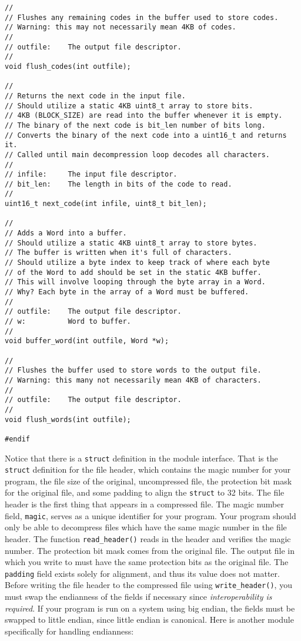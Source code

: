 \documentclass{article}
\begin{document}
\begin{lstlisting}[title=io.h]
//
// Flushes any remaining codes in the buffer used to store codes.
// Warning: this may not necessarily mean 4KB of codes.
//
// outfile:    The output file descriptor.
//
void flush_codes(int outfile);

//
// Returns the next code in the input file.
// Should utilize a static 4KB uint8_t array to store bits.
// 4KB (BLOCK_SIZE) are read into the buffer whenever it is empty.
// The binary of the next code is bit_len number of bits long.
// Converts the binary of the next code into a uint16_t and returns it.
// Called until main decompression loop decodes all characters.
//
// infile:     The input file descriptor.
// bit_len:    The length in bits of the code to read.
//
uint16_t next_code(int infile, uint8_t bit_len);

//
// Adds a Word into a buffer.
// Should utilize a static 4KB uint8_t array to store bytes.
// The buffer is written when it's full of characters.
// Should utilize a byte index to keep track of where each byte
// of the Word to add should be set in the static 4KB buffer.
// This will involve looping through the byte array in a Word.
// Why? Each byte in the array of a Word must be buffered.
//
// outfile:    The output file descriptor.
// w:          Word to buffer.
//
void buffer_word(int outfile, Word *w);

//
// Flushes the buffer used to store words to the output file.
// Warning: this many not necessarily mean 4KB of characters.
//
// outfile:    The output file descriptor.
//
void flush_words(int outfile);

#endif
\end{lstlisting}

Notice that there is a \texttt{struct} definition in the module interface. That
is the \texttt{struct} definition for the file header, which contains the magic
number for your program, the file size of the original, uncompressed file, the
protection bit mask for the original file, and some padding to align the
\texttt{struct} to 32 bits. The file header is the first thing that appears in a
compressed file. The magic number field, \texttt{magic}, serves as a unique
identifier for your program.  Your program should only be able to decompress
files which have the same magic number in the file header. The function
\texttt{read\_header()} reads in the header and verifies the magic number.  The
protection bit mask comes from the original file. The output file in which you
write to must have the same protection bits as the original file. The
\texttt{padding} field exists solely for alignment, and thus its value does not
matter. Before writing the file header to the compressed file using
\texttt{write\_header()}, you must swap the endianness of the fields if
necessary since \emph{interoperability is required}. If your program is run on a
system using big endian, the fields must be swapped to little endian, since
little endian is canonical. Here is another module specifically for handling
endianness:
\end{document}
